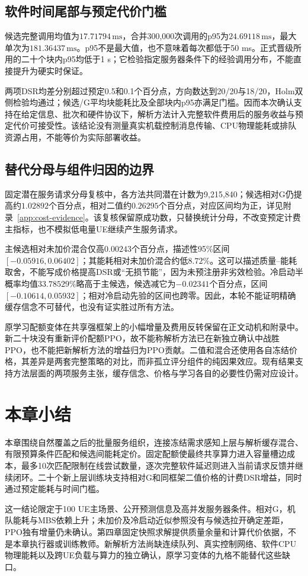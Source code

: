 \subsection{软件时间尾部与预定代价门槛}
候选完整调用均值为$17.71794\,\mathrm{ms}$，合并300,000次调用的p95为$24.69118\,\mathrm{ms}$，最大单次为$181.36437\,\mathrm{ms}$。p95不是最大值，也不意味着每次都低于50 ms。正式晋级所用的二十个块内p95均低于1 s；它检验指定服务器条件下的经验调用分布，不能直接提升为硬实时保证。

两项DSR均差分别超过预定0.5和0.1个百分点，方向数达到20/20与18/20，Holm双侧检验均通过；候选/G平均块能耗比及全部块内p95亦满足门槛。因而本次确认支持在给定信息、批次和硬件协议下，解析方法计入完整软件费用后的服务收益与预定代价可接受性。该结论没有测量真实机载控制消息传输、CPU物理能耗或排队资源占用，不能等价为实际部署收益。

\subsection{替代分母与组件归因的边界}
固定潜在服务请求分母复核中，各方法共同潜在计数为9,215,840；候选相对G仍提高约$1.02892$个百分点，相对二值约$0.26295$个百分点，对应区间均为正，详见附录~\ref{app:cost-evidence}。该复核保留原成功数，只替换统计分母，不改变预定计费主指标，也不模拟低电量UE继续产生服务请求。

主候选相对未加价混合仅高$0.00243$个百分点，描述性95\%区间$[-0.05916,0.06402]$；其能耗相对未加价混合约低$8.72\%$。这可以描述质量--能耗取舍，不能写成价格提高DSR或“无损节能”，因为未预注册非劣效检验。冷启动半概率均值$33.78529\%$略高于主候选，候选减它为$-0.02341$个百分点，区间$[-0.10614,0.05932]$；相对冷启动先验的区间也跨零。因此，本轮不能证明精确缓存信念不可替代，也没有证实胜过所有方法。

原学习配额变体在共享强框架上的小幅增量及费用反转保留在正文动机和附录中。新二十块没有重新评价配额PPO，故不能称解析方法已在新独立确认中战胜PPO，也不能把新解析方法的增益归为PPO贡献。二值和混合还使用各自冻结价格，其差异是两套完整策略的对比，而非孤立评分组件的纯因果效应。现有结果支持方法层面的两项服务主张，缓存信念、价格与学习各自的必要性仍需对应设计。

\section{本章小结}
\label{sec:whole-boundaries}
\label{sec:ch5-summary}
本章围绕自然覆盖之后的批量服务组织，连接冻结需求感知上层与解析缓存混合、有限预算条件匹配和候选间能耗定价。固定配额使最终共享算力进入容量槽边成本，最多10次匹配限制在线尝试数量，逐次完整软件延迟则进入当前请求反馈并继续闭环。二十个新上层训练块支持相对G和同框架二值价格的计费DSR增益，同时通过预定能耗与时间门槛。

这一结论限定于100 UE主场景、公开预测信息及高并发服务器条件。相对G，机队能耗与MBS依赖上升；未加价及冷启动近似参照没有与候选拉开确定差距，PPO独有增量仍未确认。第四章固定快照求解提供质量余量和计算代价依据，不是本章执行器或训练教师。新解析方法尚缺连续队列、真实控制网络、软件CPU物理能耗以及跨UE负载与算力的独立确认，原学习变体的九格不能替代这些缺口。
